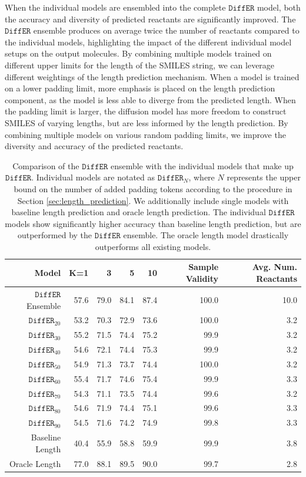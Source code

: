 \documentclass{article}
\newcommand{\ours}{$\texttt{DiffER}$\xspace}
\begin{document}
When the individual models are ensembled into the complete \ours model, both the accuracy and diversity of predicted reactants are significantly improved. The \ours ensemble produces on average twice the number of reactants compared to the individual models, highlighting the impact of the different individual model setups on the output molecules. By combining multiple models trained on different upper limits for the length of the SMILES string, we can leverage different weightings of the length prediction mechanism. When a model is trained on a lower padding limit, more emphasis is placed on the length prediction component, as the model is less able to diverge from the predicted length. When the padding limit is larger, the diffusion model has more freedom to construct SMILES of varying lengths, but are less informed by the length prediction. By combining multiple models on various random padding limits, we improve the diversity and accuracy of the predicted reactants.

\begin{table}[h]
    \small
    \centering
    \caption{Comparison of the \ours ensemble with the individual models that make up \ours. Individual models are notated as \ours$_N$, where $N$ represents the upper bound on the number of added padding tokens according to the procedure in Section \ref{sec:length_prediction}. We additionally include single models with baseline length prediction and oracle length prediction. The individual \ours models show significantly higher accuracy than baseline length prediction, but are outperformed by the \ours ensemble. The oracle length model drastically outperforms all existing models.}
    \begin{tabular}{r r r r r r r}
        \toprule
        Model & K=1 & 3 & 5 & 10 & Sample Validity & Avg. Num. Reactants \\
        \midrule
        \ours Ensemble & 57.6 & 79.0 & 84.1 & 87.4 & 100.0 & 10.0 \\
        \midrule
        \ours$_{20}$ & 53.2 & 70.3 & 72.9 & 73.6 & 100.0 & 3.2 \\
        \ours$_{30}$ & 55.2 & 71.5 & 74.4 & 75.2 & 99.9 & 3.2 \\
        \ours$_{40}$ & 54.6 & 72.1 & 74.4 & 75.3 & 99.9 & 3.2 \\
        \ours$_{50}$ & 54.9 & 71.3 & 73.7 & 74.4 & 100.0 & 3.2 \\
        \ours$_{60}$ & 55.4 & 71.7 & 74.6 & 75.4 & 99.9 & 3.3 \\
        \ours$_{70}$ & 54.3 & 71.1 & 73.5 & 74.4 & 99.6 & 3.2 \\
        \ours$_{80}$ & 54.6 & 71.9 & 74.4 & 75.1 & 99.6 & 3.3 \\
        \ours$_{90}$ & 54.5 & 71.6 & 74.2 & 74.9 & 99.8 & 3.3 \\
        \midrule
        Baseline Length & 40.4 & 55.9 & 58.8 & 59.9 & 99.9 & 3.8 \\
        Oracle Length & 77.0 & 88.1 & 89.5 & 90.0 & 99.7 & 2.8 \\
        \midrule
    \end{tabular}
    \label{tab:our_models}
\end{table}
\end{document}
